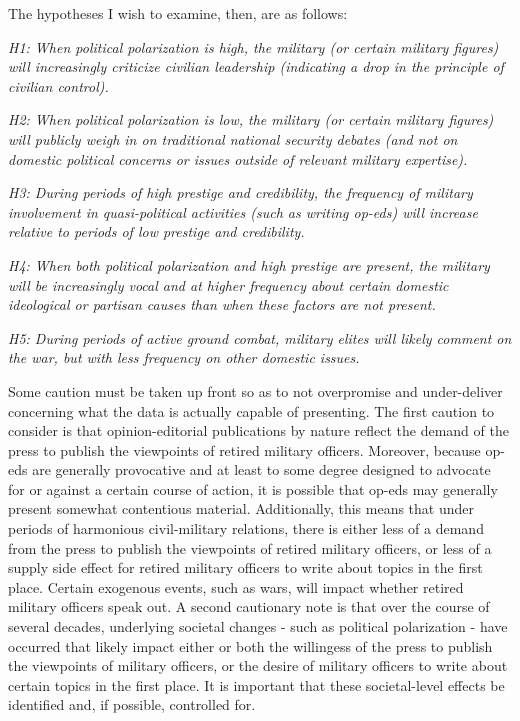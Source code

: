 \documentclass[12pt,]{article}
\begin{document}
The hypotheses I wish to examine, then, are as follows:

\emph{H1: When political polarization is high, the military (or certain military figures) will increasingly criticize civilian leadership (indicating a drop in the principle of civilian control).}

\emph{H2: When political polarization is low, the military (or certain military figures) will publicly weigh in on traditional national security debates (and not on domestic political concerns or issues outside of relevant military expertise).}

\emph{H3: During periods of high prestige and credibility, the frequency of military involvement in quasi-political activities (such as writing op-eds) will increase relative to periods of low prestige and credibility.}

\emph{H4: When both political polarization and high prestige are present, the military will be increasingly vocal and at higher frequency about certain domestic ideological or partisan causes than when these factors are not present.}

\emph{H5: During periods of active ground combat, military elites will likely comment on the war, but with less frequency on other domestic issues.}

Some caution must be taken up front so as to not overpromise and under-deliver concerning what the data is actually capable of presenting. The first caution to consider is that opinion-editorial publications by nature reflect the demand of the press to publish the viewpoints of retired military officers. Moreover, because op-eds are generally provocative and at least to some degree designed to advocate for or against a certain course of action, it is possible that op-eds may generally present somewhat contentious material. Additionally, this means that under periods of harmonious civil-military relations, there is either less of a demand from the press to publish the viewpoints of retired military officers, or less of a supply side effect for retired military officers to write about topics in the first place. Certain exogenous events, such as wars, will impact whether retired military officers speak out. A second cautionary note is that over the course of several decades, underlying societal changes - such as political polarization - have occurred that likely impact either or both the willingess of the press to publish the viewpoints of military officers, or the desire of military officers to write about certain topics in the first place. It is important that these societal-level effects be identified and, if possible, controlled for.
\end{document}
